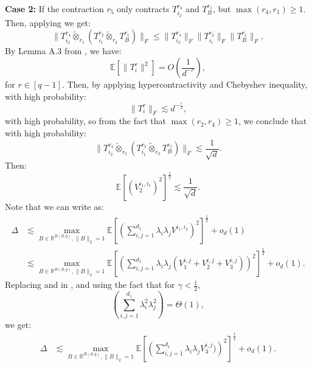\documentclass[]{article}
\numberwithin{equation}{section}
\theoremstyle{definition}
\newcommand{\RR}{\mathbb{R}}
\newcommand{\EE}{\mathbb{E}}
\begin{document}
\textbf{Case 2: }If the contraction $r_5$ only contracts $T_{i_2}^{r_4}$ and $T^{r_1}_{B}$, but $\max(r_4, r_1) \geq 1$. Then,  applying  we get:
\begin{equation}
    \| T_{i_2}^{r_4} \tilde{\otimes}_{r_5} \left ( T^{r_2}_{i_1} \tilde{\otimes}_{r_3}T^{r_1}_{B} \right )\|_{F} \leq \| T_{i_2}^{r_4}\|_F \| T^{r_2}_{i_1} \|_F \|T^{r_1}_{B}\|_{F},
\end{equation}
By Lemma A.3 from \cite{tabanelli2026deep}, we have:
\begin{equation}
    \EE \left [\| T_i^{r}\|^{2} \right ] = O\left( \dfrac{1}{d^{-r}}\right ),
\end{equation}
for $r \in [q-1]$. Then, by applying hypercontractivity and Chebyshev inequality, with high probability:  
\begin{equation}
    \| T_{i}^{r}\|_F \lesssim d^{-\frac{r}{2}},
\end{equation}
with high probability, so from the fact that $\max(r_2, r_4) \geq 1$, we conclude that with high probability: 
\begin{equation}
    \| T_{i_2}^{r_4} \tilde{\otimes}_{r_5} \left ( T^{r_2}_{i_1} \tilde{\otimes}_{r_3}T^{r_1}_{B} \right )\|_{F} \lesssim \dfrac{1}{\sqrt{d}}. 
\end{equation}
Then: 
\begin{equation}
    \EE[(V^{i_1,i_1}_2)^2]^{\frac{1}{2}} \lesssim \dfrac{1}{\sqrt{d}}. 
    \label{eq:bound_V_2_squared}
\end{equation}
Note that we can write  as:
\begin{align}
    \Delta &  \lesssim \max_{B \in \RR^{B(d,q)}, \| B\|_2 = 1} \EE \left [ \left (\sum_{i,j=1}^{d_1} \lambda_i \lambda_j V^{i_1,i_2} \right )^{2}\right ]^{\frac{1}{2}}+o_{d}(1) \\
    &\lesssim \max_{B \in \RR^{B(d,q)}, \| B\|_2 = 1} \EE \left [ \left (\sum_{i,j=1}^{d_1} \lambda_i \lambda_j (V^{i,j}_{1} + V^{i,j}_2 + V^{i,j}_{3} )\right )^{2}\right ]^{\frac{1}{2}}+o_{d}(1).
    \label{eq:operator_norm_subtraction_4}
\end{align} 
Replacing  and  in , and using the fact that for $\gamma <\frac{1}{2}$,
\begin{equation}
    \left (\sum_{i,j=1}^{d_1} \lambda_{i}^2\lambda_{j}^2\right ) = \Theta(1),
\end{equation}
we get: 
\begin{align}
    \Delta &\lesssim \max_{B \in \RR^{B(d,q)}, \| B\|_2 = 1} \EE \left [ \left (\sum_{i,j=1}^{d_1} \lambda_i \lambda_j V^{i,j}_{3} )\right )^{2}\right ]^{\frac{1}{2}}+o_{d}(1).
    \label{eq:operator_norm_subtraction_5}
\end{align} 
\end{document}
